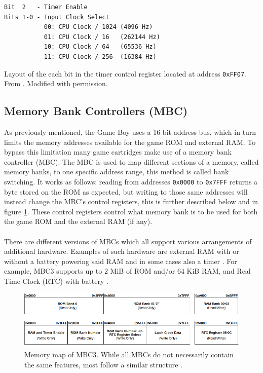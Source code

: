 \begin{table}[H]
    \begin{center}

\begin{BVerbatim}
Bit  2   - Timer Enable
Bits 1-0 - Input Clock Select
           00: CPU Clock / 1024 (4096 Hz)
           01: CPU Clock / 16   (262144 Hz)
           10: CPU Clock / 64   (65536 Hz)
           11: CPU Clock / 256  (16384 Hz)
\end{BVerbatim}

    \caption{Layout of the each bit in the timer control register located at address \texttt{0xFF07}. From \cite{pandocstimer}. Modified with permission.}
    \label{tab:timer_tac}
    \end{center}
\end{table}


\subsection{Memory Bank Controllers (MBC)}
\label{sec:MBC}

As previously mentioned, the Game Boy uses a 16-bit address bus, which in turn limits the memory addresses available for the game ROM and external RAM. 
To bypass this limitation many game cartridges make use of a memory bank controller (MBC).
The MBC is used to map different sections of a memory, called memory banks, to one specific address range, this method is called bank switching.
It works as follows: reading from addresses \texttt{0x0000} to \texttt{0x7FFF} returns a byte stored on the ROM as expected, but writing to those same addresses will instead change the MBC's control registers, this is further described below and in figure \ref{fig:MBC3}. 
These control registers control what memory bank is to be used for both the game ROM and the external RAM (if any).
\\\\
There are different versions of MBCs which all support various arrangements of additional hardware. 
Examples of such hardware are external RAM with or without a battery powering said RAM and in some cases also a timer \cite{GBWikiMBC}. For example, MBC3 supports up to 2 MiB of ROM and/or 64 KiB RAM, and Real Time Clock (RTC) with battery \cite{GBWikiMBC}.

\begin{figure}[H]
    \centering
    \includegraphics[scale=0.5]{figures/MMU/MBC3_figure_no_padding.png}
    \caption{Memory map of MBC3. While all MBCs do not necessarily contain the same features, most follow a similar structure \cite{GBWikiMBC}.}
    \label{fig:MBC3}
\end{figure}

